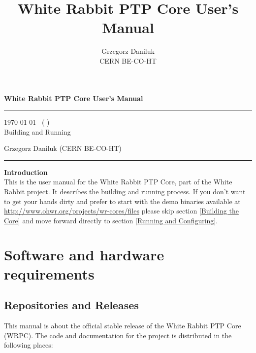 \documentclass[a4paper, 12pt]{article}
\newcommand{\codeHook}[1]{\mbox{\ttfamily\MakeTextUppercase{#1}}}
\begin{document}
\title{White Rabbit PTP Core User's Manual}
\author{Grzegorz Daniluk\\ CERN BE-CO-HT}

\raggedright
{\LARGE {\bf White Rabbit PTP Core User's Manual}}\\[0.2 cm]
\hrule height 4pt \vspace{0.1cm}
\raggedleft
{\large \today ~ ( )}\\
{\large Building and Running}\\
\vspace*{\fill}
\raggedright
{\large Grzegorz Daniluk (CERN BE-CO-HT)}\\
\hrule height 2pt
\justify

\newpage

\tableofcontents

\newpage

{\noindent \LARGE {\bf Introduction}}\\


This is the user manual for the White Rabbit PTP Core, part of the White
Rabbit project. It describes the building and running process. If you don't
want to get your hands dirty and prefer to start with the demo binaries
available at \url{http://www.ohwr.org/projects/wr-cores/files} please skip
section \ref{Building the Core} and move forward directly to section
\ref{Running and Configuring}.


\section{Software and hardware requirements}
\label{Software and hardware requirements}

\subsection{Repositories and Releases}
\label{Repositories and Releases}

This manual is about the official  stable release of the White
Rabbit PTP Core (\codeHook{WRPC}).
The code and documentation for the project is distributed in the
following places:
\end{document}
